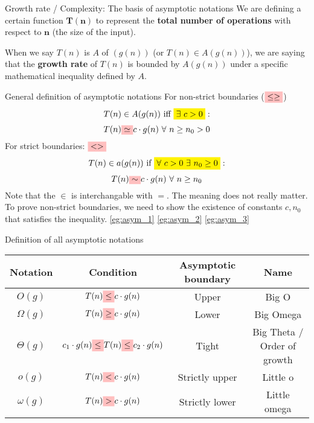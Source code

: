 \begin{theorem}
    {Growth rate / Complexity: The basis of asymptotic notations}
    We are defining a certain function $\mathbf{T(n)}$ to represent the \textbf{total number of operations} with respect to $\mathbf{n}$ (the size of the input).

    When we say $T(n)$ is $A$ of $(g(n))$ (or $T(n)\in A(g(n))$), we are saying that the \textbf{growth rate} of $T(n)$ is bounded by $A(g(n))$ under a specific mathematical inequality defined by $A$.
\end{theorem}

\begin{definition}
    {General definition of asymptotic notations}
    For non-strict boundaries ($\mathcolorbox{pink}{\leq \geq}$)
    \[T(n) \in A(g(n))\ \text{iff}\ \mathcolorbox{yellow}{\exists\ c > 0}:\]
    \[T(n) \mathcolorbox{pink}{\simeq} c\cdot g(n)\ \forall\ n \geq n_0 > 0\]
    For strict boundaries: {$\mathcolorbox{pink}{< >}$}
    \[T(n) \in a(g(n))\ \text{if}\ \mathcolorbox{yellow}{\forall\ c > 0\ \exists\ n_0 \geq 0}:\]
    \[T(n) \mathcolorbox{pink}{\sim} c\cdot g(n)\ \forall\ n \geq n_0\]
    Note that the $\in$ is interchangable with $=$. The meaning does not really matter.
    \tcblower
    To prove non-strict boundaries, we need to show the existence of constants $c, n_0$ that satisfies the inequality.
    \label{def:asym}
    \ref{eg:asym_1} \ref{eg:asym_2} \ref{eg:asym_3}
\end{definition}

\begin{definition}
    {Definition of all asymptotic notations}
    \begin{tabular}{|c|c|c|c|}
        \hline
        \textbf{Notation} & \textbf{Condition}                                                                     & \textbf{Asymptotic boundary} & \textbf{Name}               \\ \hline
        $O(g)$            & $T(n) \mathcolorbox{pink}{\leq} c\cdot g(n)$                                           & Upper                        & Big O                       \\
        $\Omega(g)$       & $T(n) \mathcolorbox{pink}{\geq} c\cdot g(n)$                                           & Lower                        & Big Omega                   \\
        $\Theta(g)$       & $ c_1\cdot g(n)\mathcolorbox{pink}{\leq} T(n) \mathcolorbox{pink}{\leq} c_2\cdot g(n)$ & Tight                        & Big Theta / Order of growth \\
        $o(g)$            & $T(n) \mathcolorbox{pink}{<} c\cdot g(n)$                                              & Strictly upper               & Little o                    \\
        $\omega(g)$       & $T(n) \mathcolorbox{pink}{>} c\cdot g(n)$                                              & Strictly lower               & Little omega                \\ \hline
    \end{tabular}
\end{definition}

